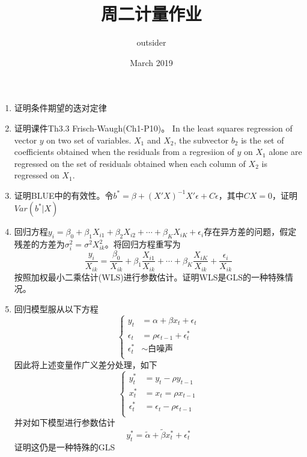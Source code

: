 \documentclass{article}
\title{周二计量作业}
\author{outsider}
\date{March 2019}
\begin{document}
\maketitle

\begin{enumerate}
    \item 证明条件期望的迭对定律
    
    \item 证明课件Th3.3 Frisch-Waugh(Ch1-P10)。 In the least squares regression of vector $y$ on two set of variables. $X_1$ and $X_2$, the subvector $b_2$ is the set of coefficients obtained when the residuals from a regresiion of $y$ on $X_1$ alone are regressed on the set of residuals obtained when each column of $X_2$ is regressed on $X_1$.
    
    \item 证明BLUE中的有效性。令$b^{*}=\beta+(X'X)^{-1}X'\epsilon+C\epsilon$，其中$CX=0$，证明$Var(b^*|X)$
    
    \item 回归方程$y_i=\beta_0+\beta_1X_{i1}+\beta_2X_{i2}+\cdots+\beta_KX_{iK}+\epsilon_i$存在异方差的问题，假定残差的方差为$\sigma_i^2=\sigma^2X_{ik}^2$。将回归方程重写为
    $$
      \frac{y_i}{X_{ik}}=\frac{\beta_0}{X_{ik}}+\beta_1\frac{X_{i1}}{X_{ik}}+\cdots+\beta_K\frac{X_{iK}}{X_{ik}}+\frac{\epsilon_i}{X_{ik}}
    $$
    按照加权最小二乘估计(WLS)进行参数估计。证明WLS是GLS的一种特殊情况。
    
    \item 回归模型服从以下方程
    $$
    \left\{
      \begin{aligned}
        y_t&=\alpha+\beta x_t+\epsilon_t \\
        \epsilon_t&=\rho \epsilon_{t-1}+\epsilon_t^{*} \\
        \epsilon_t^{*} &\sim \text{白噪声}\\
      \end{aligned}
    \right.
    $$
    因此将上述变量作广义差分处理，如下
    $$
    \left\{
      \begin{aligned}
        y_t^* &= y_t-\rho y_{t-1} \\
        x_t^* &= x_t=\rho x_{t-1}  \\
        \epsilon_t^* &= \epsilon_t-\rho \epsilon_{t-1} \\
      \end{aligned}
    \right.
    $$
    并对如下模型进行参数估计
    $$
      y_t^* = \widetilde{\alpha}+\widetilde{\beta}x_t^*+\epsilon_t^*
    $$
    证明这仍是一种特殊的GLS
\end{enumerate}
\end{document}
